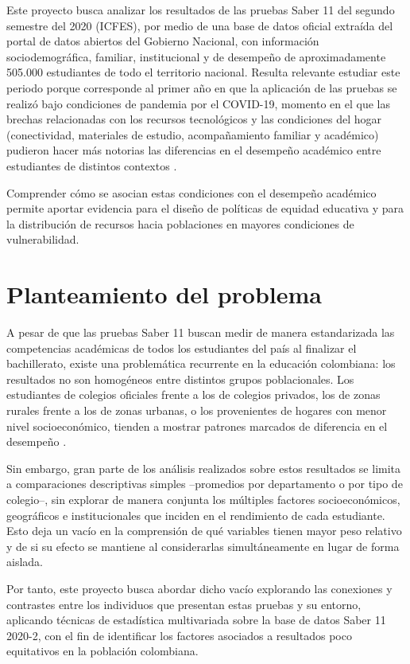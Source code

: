 \documentclass[12pt]{article}
\begin{document}
Este proyecto busca analizar los resultados de las pruebas Saber 11 del segundo semestre del 2020 (ICFES), por medio de una base de datos oficial extraída del portal de datos abiertos del Gobierno Nacional, con información sociodemográfica, familiar, institucional y de desempeño de aproximadamente 505.000 estudiantes de todo el territorio nacional. Resulta relevante estudiar este periodo porque corresponde al primer año en que la aplicación de las pruebas se realizó bajo condiciones de pandemia por el COVID-19, momento en el que las brechas relacionadas con los recursos tecnológicos y las condiciones del hogar (conectividad, materiales de estudio, acompañamiento familiar y académico) pudieron hacer más notorias las diferencias en el desempeño académico entre estudiantes de distintos contextos \parencite{cruz2016}.

Comprender cómo se asocian estas condiciones con el desempeño académico permite aportar evidencia para el diseño de políticas de equidad educativa y para la distribución de recursos hacia poblaciones en mayores condiciones de vulnerabilidad.

\section{Planteamiento del problema}
A pesar de que las pruebas Saber 11 buscan medir de manera estandarizada las competencias académicas de todos los estudiantes del país al finalizar el bachillerato, existe una problemática recurrente en la educación colombiana: los resultados no son homogéneos entre distintos grupos poblacionales. Los estudiantes de colegios oficiales frente a los de colegios privados, los de zonas rurales frente a los de zonas urbanas, o los provenientes de hogares con menor nivel socioeconómico, tienden a mostrar patrones marcados de diferencia en el desempeño \parencite{morales2024}.

Sin embargo, gran parte de los análisis realizados sobre estos resultados se limita a comparaciones descriptivas simples --promedios por departamento o por tipo de colegio--, sin explorar de manera conjunta los múltiples factores socioeconómicos, geográficos e institucionales que inciden en el rendimiento de cada estudiante. Esto deja un vacío en la comprensión de qué variables tienen mayor peso relativo y de si su efecto se mantiene al considerarlas simultáneamente en lugar de forma aislada.

Por tanto, este proyecto busca abordar dicho vacío explorando las conexiones y contrastes entre los individuos que presentan estas pruebas y su entorno, aplicando técnicas de estadística multivariada sobre la base de datos Saber 11 2020-2, con el fin de identificar los factores asociados a resultados poco equitativos en la población colombiana.
\end{document}
